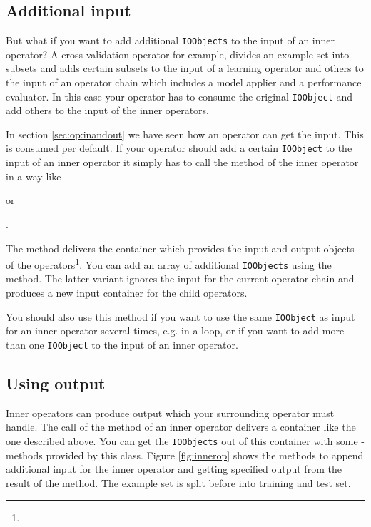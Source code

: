 \subsection{Additional input}
\label{sec:io_container}
But what if you want to add additional {\tt IOObjects} to the input of an
inner operator? A cross-validation operator for example, divides an
example set into subsets and adds certain subsets to the input of a
learning operator and others to the input of an operator chain which
includes a model applier and a performance evaluator. In this case your
operator has to consume the original {\tt IOObject} and add others to the
input of the inner operators.

In section \ref{sec:op:inandout} we have seen how an operator can get
the input. This is consumed per default. If your operator should add a
certain {\tt IOObject} to the input of an inner operator it simply has
to call the  method of the inner operator in a way like
\begin{center}
\end{center}
or
\begin{center}
.
\end{center}
The method  delivers the \rapidminer container which
provides the input and output objects of the
operators\footnote{}.
You can add an array of additional {\tt IOObjects} using the 
method. The latter variant ignores the input for the current operator
chain and produces a new input container for the child operators.

You should also use this method if you want to use the same {\tt IOObject} as
input for an inner operator several times, e.g. in a loop, or if you
want to add more than one {\tt IOObject} to the input of an inner operator.



\subsection{Using output}

Inner operators can produce output which your surrounding operator
must handle. The call of the  method of an inner
operator delivers a container like the one described above. You can
get the {\tt IOObjects} out of this container with some
-methods provided by this class. Figure
\ref{fig:innerop} shows the methods to append additional input for
the inner operator and getting specified output from the result of the
 method. The example set is split before into training and test
set.

